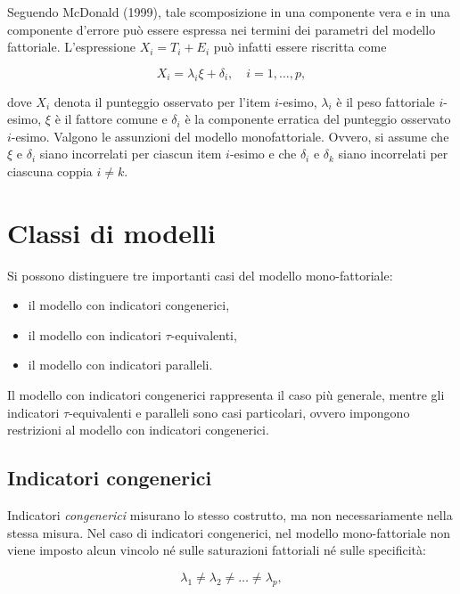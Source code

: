 \documentclass[
  11pt,
]{krantz}
\providecommand{\tightlist}{%
  \setlength{\itemsep}{0pt}\setlength{\parskip}{0pt}}
\theoremstyle{definition}
\theoremstyle{definition}
\theoremstyle{definition}
\theoremstyle{definition}
\theoremstyle{remark}
\begin{document}
Seguendo McDonald (1999), tale scomposizione in una componente vera e in una componente d'errore può essere espressa nei termini dei parametri del modello fattoriale. L'espressione \(X_i = T_i + E_i\) può infatti essere riscritta come

\[
X_i = \lambda_i \xi + \delta_i, \quad{i=1, \dots, p},
\]

dove \(X_i\) denota il punteggio osservato per l'item \(i\)-esimo, \(\lambda_i\) è il peso fattoriale \(i\)-esimo, \(\xi\) è il fattore comune e \(\delta_i\) è la componente erratica del punteggio osservato \(i\)-esimo. Valgono le assunzioni del modello monofattoriale. Ovvero, si assume che \(\xi\) e \(\delta_i\) siano incorrelati per ciascun item \(i\)-esimo e che \(\delta_i\) e \(\delta_k\) siano incorrelati per ciascuna coppia \(i \neq k\).

\hypertarget{classi-di-modelli}{%
\section{Classi di modelli}\label{classi-di-modelli}}

Si possono distinguere tre importanti casi del modello mono-fattoriale:

\begin{itemize}
\tightlist
\item
  il modello con indicatori congenerici,
\item
  il modello con indicatori \(\tau\)-equivalenti,
\item
  il modello con indicatori paralleli.
\end{itemize}

Il modello con indicatori congenerici rappresenta il caso più generale, mentre gli indicatori \(\tau\)-equivalenti e paralleli sono casi particolari, ovvero impongono restrizioni al modello con indicatori congenerici.

\hypertarget{indicatori-congenerici}{%
\subsection{Indicatori congenerici}\label{indicatori-congenerici}}

Indicatori \emph{congenerici} misurano lo stesso costrutto, ma non necessariamente nella stessa misura. Nel caso di indicatori congenerici, nel modello mono-fattoriale non viene imposto alcun vincolo né sulle saturazioni fattoriali né sulle specificità:

\[
\lambda_1\neq \lambda_2 \neq \dots\neq \lambda_p,
\]
\end{document}
